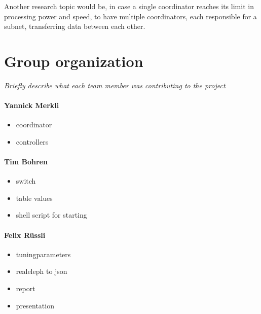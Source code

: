 \documentclass[11pt,oneside,a4paper]{article}
\newcommand{\hint}[1]{{\color{blue} \em #1}}
\begin{document}
Another research topic would be, in case a single coordinator reaches its limit in processing power and speed, to have multiple coordinators, each responsible for a subnet, transferring data between each other.

\label{lastpage} %
\clearpage
{}



\clearpage
\appendix
{}

\section{Group organization}
\hint{Briefly describe what each team member was contributing to the project}%

\paragraph{Yannick Merkli}
\begin{itemize}
	\item coordinator
	\item controllers
\end{itemize}


\paragraph{Tim Bohren}
\begin{itemize}
	\item switch
	\item table values
	\item shell script for starting
\end{itemize}

\paragraph{Felix Rüssli}
\begin{itemize}
	\item tuningparameters
	\item realeleph to json
	\item report
	\item presentation
\end{itemize}
\end{document}

